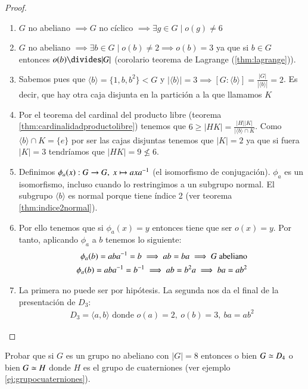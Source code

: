 \begin{proof}
	\begin{enumerate}
		\item $G$ no abeliano $\implies G$ no cíclico $\implies \exists g \in G \mid o(g) \neq 6$
		\item $G$ no abeliano $\implies \exists b \in G \mid o(b) \neq 2 \implies o(b) = 3$ ya que si $b \in G$ entonces $o(b) \divides |G|$ (corolario teorema de Lagrange (\ref{thm:lagrange})).
		\item Sabemos pues que $\langle b \rangle = \{1, b, b^2\} < G$ y $|\langle b \rangle| = 3 \implies [G:\langle b \rangle] = \frac{|G|}{|\langle b \rangle|} = 2$. Es decir, que hay otra caja disjunta en la partición a la que llamamos $K$
		\item Por el teorema del cardinal del producto libre (teorema \ref{thm:cardinalidadproductolibre}) tenemos que $6 \geq |HK| = \frac{|H||K|}{|\langle b \rangle \cap K}$. Como $\langle b \rangle \cap K = \{e\}$ por ser las cajas disjuntas tenemos que $|K| = 2$ ya que si fuera $|K| = 3$ tendríamos que $|HK| = 9 \not \leq 6$.
		\item Definimos $\phi_a(x) : G \to G,\ x \mapsto axa^{-1}$ (el isomorfismo de conjugación). $\phi_a$ es un isomorfismo, incluso cuando lo restringimos a un subgrupo normal. El subgrupo $\langle b \rangle$ es normal porque tiene índice 2 (ver teorema \ref{thm:indice2normal}).
		\item Por ello tenemos que si $\phi_a(x) = y$ entonces tiene que ser $o(x) = y$. Por tanto, aplicando $\phi_a$ a $b$ tenemos lo siguiente:
		\begin{align*}
		\phi_a(b) = aba^{-1} = b \implies ab = ba \implies G \text{ abeliano} \\
		\phi_a(b) = aba^{-1} = b^{-1} \implies ab = b^2a \implies ba = ab^2
		\end{align*}
		\item La primera no puede ser por hipótesis. La segunda nos da el final de la presentación de $D_3$:
		\begin{align*}
		D_3 = \langle a, b \rangle \text{ donde } o(a) = 2,\ o(b) = 3,\ ba = ab^2
		\end{align*}
	\end{enumerate}
\end{proof}

\begin{ej}
	\label{ej:orden8noabisom}
	Probar que si $G$ es un grupo no abeliano con $|G| = 8$ entonces o bien $G \simeq D_4$ o bien $G \simeq H$ donde $H$ es el grupo de cuaterniones (ver ejemplo \ref{ej:grupocuaterniones}).
\end{ej}

